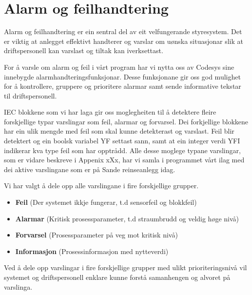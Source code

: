\newpage
\section{Alarm og feilhandtering}
\thispagestyle{fancy}

Alarm og feilhandtering er ein sentral del av eit velfungerande styresystem. Det er viktig
at anlegget effektivt handterer og varslar om uønska situasjonar slik at 
driftspersonell kan varslast og tiltak kan iverksettast.

For å varsle om alarm og feil i vårt program har vi nytta oss av \gls{Codesys} sine
innebygde alarmhandteringsfunksjonar. Desse funksjonane gir oss god mulighet for å 
kontrollere, gruppere og prioritere alarmar samt sende informative tekstar til driftspersonell.

IEC blokkene som vi har laga gir oss moglegheiten til å detektere fleire forskjellige typar varslingar
som feil, alarmar og forvarsel.
Dei forkjellige blokkene har ein ulik mengde med feil som skal kunne detekterast og varslast.
Feil blir detektert og ein boolsk variabel YF settast sann, 
samt at ein integer verdi YFI indikerar kva type feil som har opptrådd.\newline
Alle desse moglege typane varslingar, som er vidare beskreve i Appenix xXx, 
har vi samla i programmet vårt ilag 
med dei aktive varslingane som er på Sande reinseanlegg idag.

Vi har valgt å dele opp alle varslingane i fire forskjellige grupper.

\begin{itemize}
    \item \textbf{Feil}          (Der systemet ikkje fungerar, t.d sensorfeil og blokkfeil)
    \item \textbf{Alarmar}       (Kritisk prosessparameter, t.d straumbrudd og veldig høge nivå)
    \item \textbf{Forvarsel}     (Prosessparameter på veg mot kritisk nivå)
    \item \textbf{Informasjon}   (Prosessinformasjon med nytteverdi)
\end{itemize}

Ved å dele opp varslingar i fire forskjellige grupper med ulikt prioriteringsnivå vil systemet
og driftspersonell enklare kunne forstå samanhengen og alvoret på varslinga.


\newpage